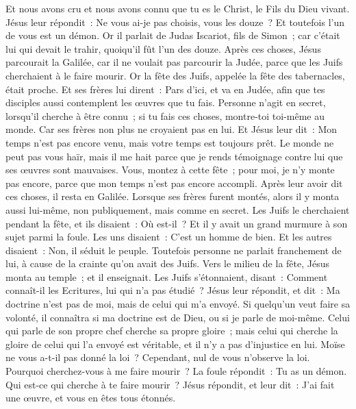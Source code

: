 \begin{multicols}{2}
Et nous avons cru et nous avons connu que tu es le Christ, le Fils du Dieu vivant.
Jésus leur répondit~: Ne vous ai-je pas choisis, vous les douze~? Et toutefois l'un de vous est un démon.
Or il parlait de Judas Iscariot, fils de Simon~; car c'était lui qui devait le trahir, quoiqu'il fût l'un des douze.
\VerseOne{}Après ces choses, Jésus parcourait la Galilée, car il ne voulait pas parcourir la Judée, parce que les Juifs cherchaient à le faire mourir.
Or la fête des Juifs, appelée la fête des tabernacles, était proche.
Et ses frères lui dirent~: Pars d'ici, et va en Judée, afin que tes disciples aussi contemplent les œuvres que tu fais.
Personne n'agit en secret, lorsqu'il cherche à être connu~; si tu fais ces choses, montre-toi toi-même au monde.
Car ses frères non plus ne croyaient pas en lui.
Et Jésus leur dit~: Mon temps n'est pas encore venu, mais votre temps est toujours prêt.
Le monde ne peut pas vous haïr, mais il me hait parce que je rends témoignage contre lui que ses œuvres sont mauvaises.
Vous, montez à cette fête~; pour moi, je n'y monte pas encore, parce que mon temps n'est pas encore accompli.
Après leur avoir dit ces choses, il resta en Galilée.
Lorsque ses frères furent montés, alors il y monta aussi lui-même, non publiquement, mais comme en secret.
Les Juifs le cherchaient pendant la fête, et ils disaient~: Où est-il~?
Et il y avait un grand murmure à son sujet parmi la foule. Les uns disaient~: C'est un homme de bien. Et les autres disaient~: Non, il séduit le peuple.
Toutefois personne ne parlait franchement de lui, à cause de la crainte qu'on avait des Juifs.
Vers le milieu de la fête, Jésus monta au temple~; et il enseignait.
Les Juifs s'étonnaient, disant~: Comment connaît-il les Ecritures, lui qui n'a pas étudié~?
Jésus leur répondit, et dit~: Ma doctrine n'est pas de moi, mais de celui qui m'a envoyé.
Si quelqu'un veut faire sa volonté, il connaîtra si ma doctrine est de Dieu, ou si je parle de moi-même.
Celui qui parle de son propre chef cherche sa propre gloire~; mais celui qui cherche la gloire de celui qui l'a envoyé est véritable, et il n'y a pas d'injustice en lui.
Moïse ne vous a-t-il pas donné la loi~? Cependant, nul de vous n'observe la loi. Pourquoi cherchez-vous à me faire mourir~?
La foule répondit~: Tu as un démon. Qui est-ce qui cherche à te faire mourir~?
Jésus répondit, et leur dit~: J'ai fait une œuvre, et vous en êtes tous étonnés.

\end{multicols}
